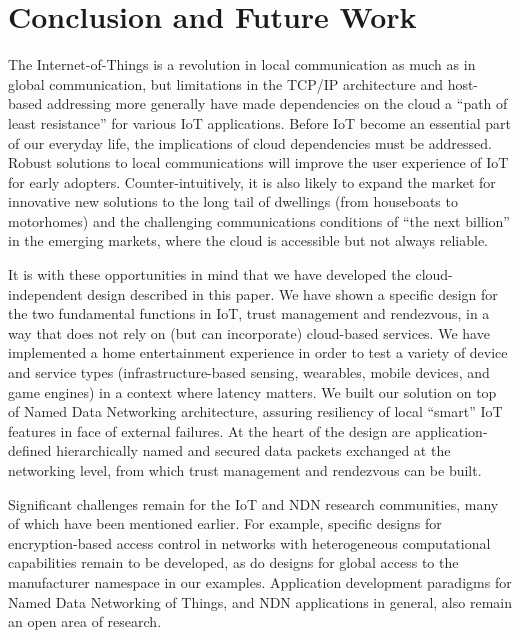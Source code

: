 \section{Conclusion and Future Work}
\label{sec:conclusion}

The Internet-of-Things is a revolution in local communication as much as in global communication, but limitations in the TCP/IP architecture and host-based addressing more generally have made dependencies on the cloud a ``path of least resistance'' for various IoT applications.
Before IoT become an essential part of our everyday life, the implications of cloud dependencies must be addressed.
Robust solutions to local communications will improve the user experience of IoT for early adopters.
Counter-intuitively, it is also likely to expand the market for innovative new solutions to the long tail of dwellings (from houseboats to motorhomes) and the challenging communications conditions of ``the next billion'' in the emerging markets, where the cloud is accessible but not always reliable.  

It is with these opportunities in mind that we have developed the cloud-independent design described in this paper.
We have shown a specific design for the two fundamental functions in IoT, trust management and rendezvous, in a way that does not rely on (but can incorporate) cloud-based services.
We have implemented a home entertainment experience in order to test a variety of device and service types (infrastructure-based sensing, wearables, mobile devices, and game engines) in a context where latency matters.
We built our solution on top of Named Data Networking architecture, assuring resiliency of local ``smart'' IoT features in face of external failures.
At the heart of the design are application-defined hierarchically named and secured data packets exchanged at the networking level, from which trust management and rendezvous can be built. 

Significant challenges remain for the IoT and NDN research communities, many of which have been mentioned earlier.  For example, specific designs for encryption-based access control in networks with heterogeneous computational capabilities remain to be developed, as do designs for global access to the manufacturer namespace in our examples.  Application development paradigms for Named Data Networking of Things, and NDN applications in general, also remain an open area of research. 
